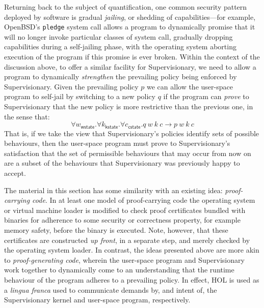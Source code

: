 \documentclass[a4paper, UKenglish, cleveref, autoref, thm-restate, colorlinks]{lipics-v2021}
\newcommand{\fall}[1]{\forall{#1}.}
\begin{document}
Returning back to the subject of quantification, one common security pattern deployed by software is gradual \emph{jailing}, or shedding of capabilities---for example, OpenBSD's \texttt{pledge} system call allows a program to dynamically promise that it will no longer invoke particular classes of system call, gradually dropping capabilities during a self-jailing phase, with the operating system aborting execution of the program if this promise is ever broken.
Within the context of the discussion above, to offer a similar facility for Supervisionary, we need to allow a program to dynamically \emph{strengthen} the prevailing policy being enforced by Supervisionary.
Given the prevailing policy $p$ we can allow the user-space program to self-jail by switching to a new policy $q$ if the program can \emph{prove} to Supervisionary that the new policy is more restrictive than the previous one, in the sense that:
\begin{displaymath}
\fall{w_{\mathsf{wstate}}}\fall{k_{\mathsf{kstate}}}\fall{c_{\mathsf{cstate}}}q\ w\ k\ c \longrightarrow p\ w\ k\ c
\end{displaymath}
That is, if we take the view that Supervisionary's policies identify sets of possible behaviours, then the user-space program must prove to Supervisionary's satisfaction that the set of permissible behaviours that may occur from now on are a subset of the behaviours that Supervisionary was previously happy to accept.

The material in this section has some similarity with an existing idea: \emph{proof-carrying code}.
In at least one model of proof-carrying code the operating system or virtual machine loader is modified to check proof certificates bundled with binaries for adherence to some security or correctness property, for example memory safety, before the binary is executed.
Note, however, that these certificates are constructed \emph{up front}, in a separate step, and merely checked by the operating system loader.
In contrast, the ideas presented above are more akin to \emph{proof-generating code}, wherein the user-space program and Supervisionary work together to dynamically come to an understanding that the runtime behaviour of the program adheres to a prevailing policy.
In effect, HOL is used as a \emph{lingua franca} used to communicate demands by, and intent of, the Supervisionary kernel and user-space program, respectively.
\end{document}
